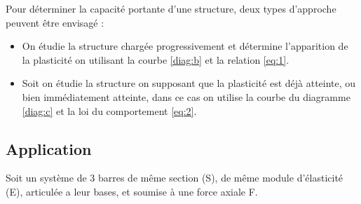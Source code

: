\documentclass[12pt,a4paper]{report}
\begin{document}
	
	
	
	Pour déterminer la capacité portante d'une structure, deux types d'approche peuvent être envisagé :
	
	\begin{itemize}
		\item On étudie la structure chargée progressivement et détermine l'apparition de la plasticité on utilisant la courbe \ref{diag:b} et la relation \ref{eq:1}.
		
		\item Soit on étudie la structure on supposant que la plasticité est déjà atteinte, ou bien immédiatement atteinte, dans ce cas on utilise la courbe du diagramme \ref{diag:c} et la loi du comportement \ref{eq:2}.
	\end{itemize}
	
	
	
	
	\subsection{Application}
	
	Soit un système de 3 barres de même section (S), de même module d'élasticité (E), articulée a leur bases, et soumise à une force axiale F.
	
\end{document}

